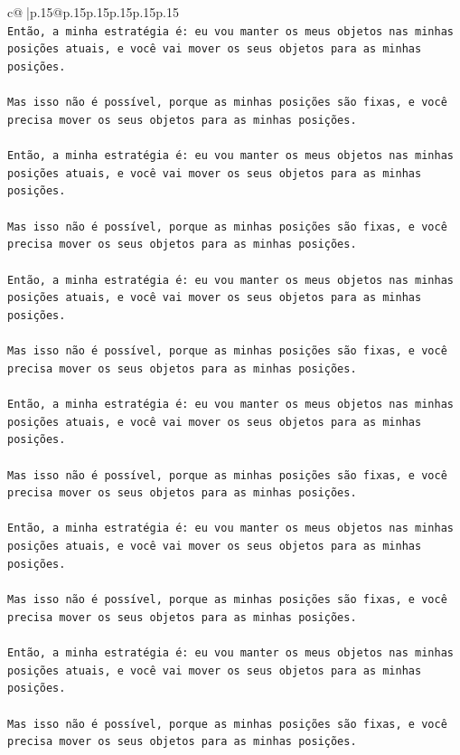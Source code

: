 \documentclass{article}
\begin{document}
{\begin{supertabular}{c@{$\;$}|p{.15\linewidth}@{}p{.15\linewidth}p{.15\linewidth}p{.15\linewidth}p{.15\linewidth}p{.15\linewidth}}
{{{\\ 
\texttt{Então, a minha estratégia é: eu vou manter os meus objetos nas minhas posições atuais, e você vai mover os seus objetos para as minhas posições.} \\
\\ 
\texttt{Mas isso não é possível, porque as minhas posições são fixas, e você precisa mover os seus objetos para as minhas posições.} \\
\\ 
\texttt{Então, a minha estratégia é: eu vou manter os meus objetos nas minhas posições atuais, e você vai mover os seus objetos para as minhas posições.} \\
\\ 
\texttt{Mas isso não é possível, porque as minhas posições são fixas, e você precisa mover os seus objetos para as minhas posições.} \\
\\ 
\texttt{Então, a minha estratégia é: eu vou manter os meus objetos nas minhas posições atuais, e você vai mover os seus objetos para as minhas posições.} \\
\\ 
\texttt{Mas isso não é possível, porque as minhas posições são fixas, e você precisa mover os seus objetos para as minhas posições.} \\
\\ 
\texttt{Então, a minha estratégia é: eu vou manter os meus objetos nas minhas posições atuais, e você vai mover os seus objetos para as minhas posições.} \\
\\ 
\texttt{Mas isso não é possível, porque as minhas posições são fixas, e você precisa mover os seus objetos para as minhas posições.} \\
\\ 
\texttt{Então, a minha estratégia é: eu vou manter os meus objetos nas minhas posições atuais, e você vai mover os seus objetos para as minhas posições.} \\
\\ 
\texttt{Mas isso não é possível, porque as minhas posições são fixas, e você precisa mover os seus objetos para as minhas posições.} \\
\\ 
\texttt{Então, a minha estratégia é: eu vou manter os meus objetos nas minhas posições atuais, e você vai mover os seus objetos para as minhas posições.} \\
\\ 
\texttt{Mas isso não é possível, porque as minhas posições são fixas, e você precisa mover os seus objetos para as minhas posições.} \\
}}}
\end{supertabular}}
\end{document}
